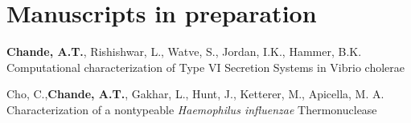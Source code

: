 \documentclass[11pt,letterpaper,sans]{moderncv} %
\begin{document}
\section{Manuscripts in preparation}

\begin{etaremune}
\item \textbf{Chande, A.T.}, Rishishwar, L., Watve, S., Jordan, I.K., Hammer, B.K. Computational characterization of Type VI Secretion Systems in Vibrio cholerae
\item Cho, C.,\textbf{Chande, A.T.}, Gakhar, L., Hunt, J., Ketterer, M., Apicella, M. A. Characterization of a nontypeable \textit{Haemophilus influenzae} Thermonuclease
\end{etaremune}
\end{document}
